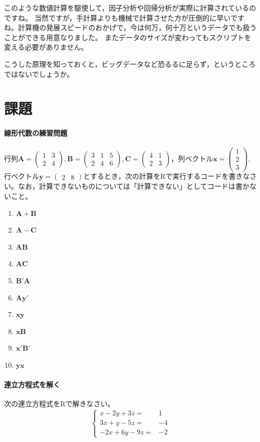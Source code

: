 \documentclass{ltjsbook}
\begin{document}
このような数値計算を駆使して，因子分析や回帰分析が実際に計算されているのですね。
当然ですが，手計算よりも機械で計算させた方が圧倒的に早いですね。計算機の発展スピードのおかげで，今は何万，何十万というデータでも扱うことができる用意なりました。
またデータのサイズが変わってもスクリプトを変える必要がありません。

こうした原理を知っておくと，ビッグデータなど恐るるに足らず，というところではないでしょうか。

\section{課題}
\paragraph{線形代数の練習問題}行列$\bm{A}=\begin{pmatrix}1 & 3 \\2 & 4\end{pmatrix},\bm{B}=\begin{pmatrix}3&1&5\\2&4&6\end{pmatrix},\bm{C}=\begin{pmatrix}4&1\\2&3\end{pmatrix}$，列ベクトル$\bm{x}=\begin{pmatrix}1\\2\\3\end{pmatrix}$,行ベクトル$\bm{y}=\begin{pmatrix}2&8\end{pmatrix}$とするとき，次の計算をRで実行するコードを書きなさい。なお，計算できないものについては「計算できない」としてコードは書かないこと。
\begin{enumerate}
    \item $\bm{A}+\bm{B}$
    \item $\bm{A}-\bm{C}$
    \item $\bm{AB}$
    \item $\bm{AC}$
    \item $\bm{B}'\bm{A}$
    \item $\bm{A}\bm{y}'$
    \item $\bm{xy}$
    \item $\bm{xB}$
    \item $\bm{x}'\bm{B}'$
    \item $\bm{yx}$
\end{enumerate}

\paragraph{連立方程式を解く}次の連立方程式をRで解きなさい。
\[
\left\{\begin{array}{rr}x-2 y+3 z= & 1 \\ 3 x+y-5 z= & -4 \\ -2 x+6 y-9 z= & -2\end{array}\right.
\]
\end{document}
